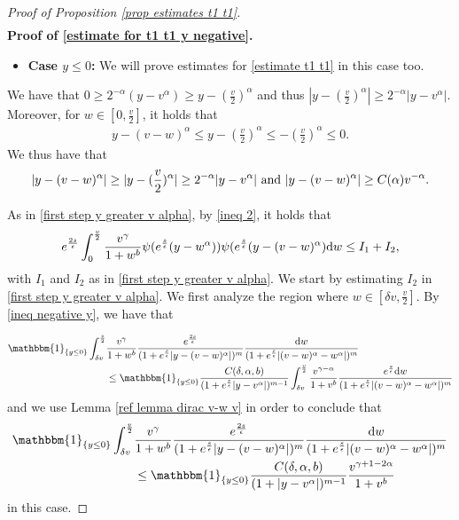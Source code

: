 \documentclass[11pt]{article}
\numberwithin{equation}{section}
\newcommand{\der}{\textup{d}}
\begin{document}
\begin{proof}[Proof of Proposition 
\ref{prop estimates t1 t1}]
\begin{align*}
   \end{align*}
\textbf{Proof of \eqref{estimate for t1 t1 y negative}.}
\begin{itemize}
    \item \textbf{Case $y\leq 0$:}  We will prove estimates for \eqref{estimate t1 t1} in this case too. 
\end{itemize}
We have that $0\geq 2^{-\alpha}(y-v^{\alpha})\geq y-(\frac{v}{2})^{\alpha}$ and thus $| y-(\frac{v}{2})^{\alpha}|\geq  2^{-\alpha}|y-v^{\alpha}|$. Moreover, for $w\in[0,\frac{v}{2}]$, it holds that 
\begin{align}
y-(v-w)^{\alpha}\leq y-(\frac{v}{2})^{\alpha}\leq -(\frac{v}{2})^{\alpha}\leq 0.
\end{align}
We thus have that 
\begin{align}\label{ineq negative y}
    |y-(v-w)^{\alpha}|\geq |y-(\frac{v}{2})^{\alpha}|\geq  2^{-\alpha}|y-v^{\alpha}| \textup{ and }  |y-(v-w)^{\alpha}|\geq C(\alpha) v^{-\alpha}.
\end{align} 

As in \eqref{first step y greater v alpha}, by \eqref{ineq 2}, it holds that
\begin{align*}
e^{\frac{2s}{\epsilon}}\int_{0}^{\frac{v}{2}}\frac{v^{\gamma}}{1+w^{b}}\psi(e^{\frac{s}{\epsilon}}(y-w^{\alpha}))\psi(e^{\frac{s}{\epsilon}}(y-(v-w)^{\alpha})\der w \leq I_{1}+I_{2},
\end{align*}
with $I_{1}$ and $I_{2}$ as in \eqref{first step y greater v alpha}. We start by estimating $I_{2}$ in \eqref{first step y greater v alpha}. We first analyze the region where $w\in[\delta v, \frac{v}{2}]$. By \eqref{ineq negative y}, we have that

\begin{align}
\mathbbm{1}_{\{y\leq 0\}}\int_{\delta v}^{\frac{v}{2}}&\frac{v^{\gamma}}{1+w^{b}}\frac{e^{\frac{2s}{\epsilon}}}{(1+e^{\frac{s}{\epsilon}}|y-(v-w)^{\alpha}|)^{m}}\frac{\der w}{(1+e^{\frac{s}{\epsilon}}|(v-w)^{\alpha}-w^{\alpha}|)^{m}}\nonumber\\
&\leq \mathbbm{1}_{\{y\leq 0\}}\frac{C(\delta,\alpha,b)}{(1+e^{\frac{s}{\epsilon}}|y-v^{\alpha}|)^{m-1}} \int_{\delta v}^{\frac{v}{2}}\frac{v^{\gamma-\alpha}}{1+v^{b}}\frac{e^{\frac{s}{\epsilon}}\der w}{(1+e^{\frac{s}{\epsilon}}|(v-w)^{\alpha}-w^{\alpha}|)^{m}}\label{y neg w close to v term v-w}
\end{align}
and we use Lemma \ref{ref lemma dirac v-w v} in order to conclude that
\begin{align}
\mathbbm{1}_{\{y\leq 0\}}\int_{\delta v}^{\frac{v}{2}}&\frac{v^{\gamma}}{1+w^{b}}\frac{e^{\frac{2s}{\epsilon}}}{(1+e^{\frac{s}{\epsilon}}|y-(v-w)^{\alpha}|)^{m}}\frac{\der w}{(1+e^{\frac{s}{\epsilon}}|(v-w)^{\alpha}-w^{\alpha}|)^{m}}\nonumber\\
&\leq   \mathbbm{1}_{\{y\leq 0\}}  \frac{C(\delta,\alpha,b)}{(1+|y-v^{\alpha}|)^{m-1}}  \frac{ v^{\gamma+1-2\alpha}}{1+v^{b}}\label{y neg w close to v term v-w part two}
\end{align}
in this case.


\end{proof}
\end{document}
